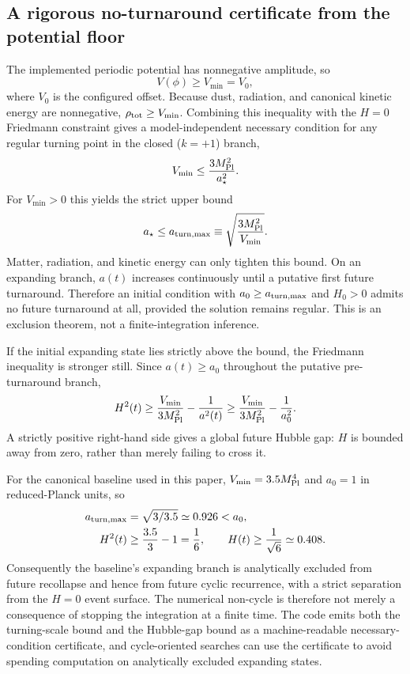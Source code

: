 \subsection{A rigorous no-turnaround certificate from the potential floor}
The implemented periodic potential has nonnegative amplitude, so
\begin{equation}
V(\phi)\ge V_{\min}=V_0,
\end{equation}
where $V_0$ is the configured offset. Because dust, radiation, and canonical kinetic energy are nonnegative, $\rho_{\rm tot}\ge V_{\min}$. Combining this inequality with the $H=0$ Friedmann constraint gives a model-independent necessary condition for any regular turning point in the closed ($k=+1$) branch,
\begin{equation}
V_{\min}\le \frac{3M_{\mathrm{Pl}}^2}{a_\star^2}.
\end{equation}
For $V_{\min}>0$ this yields the strict upper bound
\begin{equation}
a_\star\le a_{\rm turn,max}\equiv\sqrt{\frac{3M_{\mathrm{Pl}}^2}{V_{\min}}}.
\label{eq:turning-upper-bound}
\end{equation}
Matter, radiation, and kinetic energy can only tighten this bound. On an expanding branch, $a(t)$ increases continuously until a putative first future turnaround. Therefore an initial condition with $a_0\ge a_{\rm turn,max}$ and $H_0>0$ admits no future turnaround at all, provided the solution remains regular. This is an exclusion theorem, not a finite-integration inference.

If the initial expanding state lies strictly above the bound, the Friedmann inequality is stronger still. Since $a(t)\ge a_0$ throughout the putative pre-turnaround branch,
\begin{equation}
H^2(t)\ge \frac{V_{\min}}{3M_{\mathrm{Pl}}^2}-\frac{1}{a^2(t)}
\ge \frac{V_{\min}}{3M_{\mathrm{Pl}}^2}-\frac{1}{a_0^2}.
\label{eq:future-hubble-gap}
\end{equation}
A strictly positive right-hand side gives a global future Hubble gap: $H$ is bounded away from zero, rather than merely failing to cross it.

For the canonical baseline used in this paper, $V_{\min}=3.5M_{\mathrm{Pl}}^4$ and $a_0=1$ in reduced-Planck units, so
\begin{align}
a_{\rm turn,max}&=\sqrt{3/3.5}\simeq0.926<a_0,\\
H^2(t)&\ge\frac{3.5}{3}-1=\frac16,\qquad H(t)\ge\frac{1}{\sqrt6}\simeq0.408.
\end{align}
Consequently the baseline's expanding branch is analytically excluded from future recollapse and hence from future cyclic recurrence, with a strict separation from the $H=0$ event surface. The numerical non-cycle is therefore not merely a consequence of stopping the integration at a finite time. The code emits both the turning-scale bound and the Hubble-gap bound as a machine-readable necessary-condition certificate, and cycle-oriented searches can use the certificate to avoid spending computation on analytically excluded expanding states.

